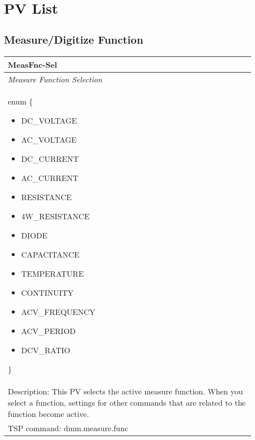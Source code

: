 \documentclass[openany]{article}
\begin{document}
\section{PV List}

	\renewcommand{\arraystretch}{2}

	\subsection{Measure/Digitize Function}\label{pvgroup:function}

		\paragraph{} %

		\begin{tabular}{N}
			\hline
			\bfseries MeasFnc-Sel \\ \hline
			\emph{Measure Function Selection} \\
			enum \{\begin{itemize}[noitemsep]
				\small
				\item[] DC\_VOLTAGE
				\item[] AC\_VOLTAGE
				\item[] DC\_CURRENT
				\item[] AC\_CURRENT
				\item[] RESISTANCE
				\item[] 4W\_RESISTANCE
				\item[] DIODE
				\item[] CAPACITANCE
				\item[] TEMPERATURE
				\item[] CONTINUITY
				\item[] ACV\_FREQUENCY
				\item[] ACV\_PERIOD
				\item[] DCV\_RATIO
			\end{itemize}\} \\
			Description: This PV selects the active measure function. When you select a function, settings for other commands that are related to the function become active. \\
			TSP command: dmm.measure.func
		\end{tabular}
\end{document}
